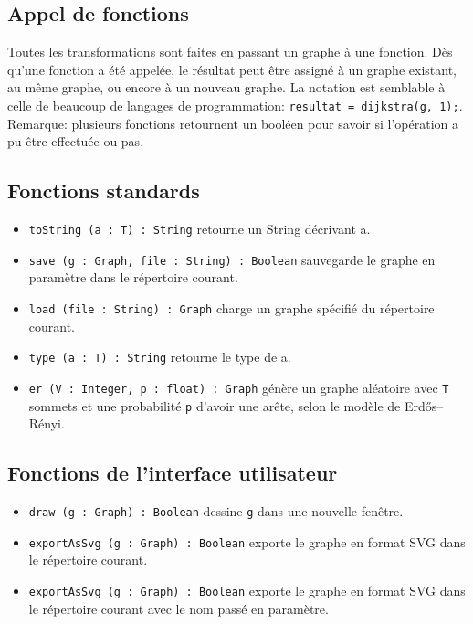 \documentclass[french]{article}
\begin{document}
		\subsection{Appel de fonctions}
		Toutes les transformations sont faites en passant un graphe à une fonction. Dès qu'une fonction a été appelée, le résultat peut être assigné à un graphe existant, au même graphe, ou encore à un nouveau graphe. La notation est semblable à celle de beaucoup de langages de programmation: \texttt{resultat = dijkstra(g, 1);}. Remarque: plusieurs fonctions retournent un booléen pour savoir si l'opération a pu être effectuée ou pas.
		
		\subsection{Fonctions standards}
		\begin{itemize}
			\item \texttt{toString (a : T) : String} retourne un String décrivant a.
			\item \texttt{save (g : Graph, file : String) : Boolean} sauvegarde le graphe en paramètre dans le répertoire courant.
			\item \texttt{load (file : String) : Graph} charge un graphe spécifié du répertoire courant.
			\item \texttt{type (a : T) : String} retourne le type de a.
			\item \texttt{er (V : Integer, p : float) : Graph} génère un graphe aléatoire avec \texttt{T} sommets et une probabilité \texttt{p} d'avoir une arête, selon le modèle de Erdős–Rényi.
		\end{itemize}
		
		\subsection{Fonctions de l'interface utilisateur}
		\begin{itemize}
			\item \texttt{draw (g : Graph) : Boolean} dessine \texttt{g} dans une nouvelle fenêtre.
			\item \texttt{exportAsSvg (g : Graph) : Boolean} exporte le graphe en format SVG dans le répertoire courant.
			\item \texttt{exportAsSvg (g : Graph) : Boolean} exporte le graphe en format SVG dans le répertoire courant avec le nom passé en paramètre.
		\end{itemize}
		
\end{document}
